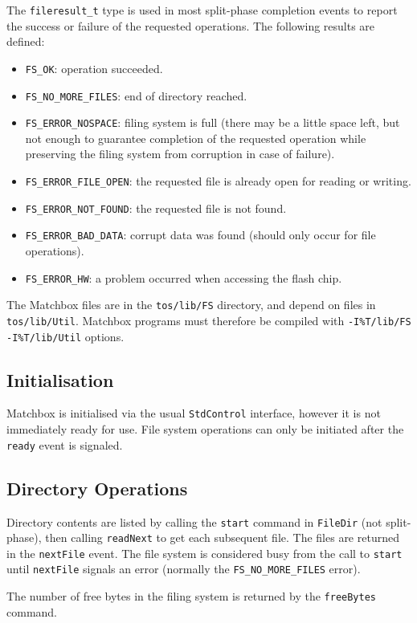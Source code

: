 \documentclass[10pt]{article}
\newcommand{\kw}[1]{\mbox{\tt #1}}
\newcommand{\file}[1]{\mbox{\tt #1}}
\begin{document}
The \kw{fileresult\_t} type is used in most split-phase completion events
to report the success or failure of the requested operations. The
following results are defined:
\begin{itemize}
\item \kw{FS\_OK}: operation succeeded.
\item \kw{FS\_NO\_MORE\_FILES}: end of directory reached.
\item \kw{FS\_ERROR\_NOSPACE}: filing system is full (there may be a
little space left, but not enough to guarantee completion of the requested
operation while preserving the filing system from corruption in case of
failure).
\item \kw{FS\_ERROR\_FILE\_OPEN}: the requested file is already open for
reading or writing.
\item \kw{FS\_ERROR\_NOT\_FOUND}: the requested file is not found.
\item \kw{FS\_ERROR\_BAD\_DATA}: corrupt data was found (should only occur
for file operations).
\item \kw{FS\_ERROR\_HW}: a problem occurred when accessing the flash chip.
\end{itemize}

The Matchbox files are in the \file{tos/lib/FS} directory, and depend
on files in \file{tos/lib/Util}. Matchbox programs must therefore be
compiled with \kw{-I\%T/lib/FS -I\%T/lib/Util} options.

\subsection{Initialisation}

Matchbox is initialised via the usual \kw{StdControl} interface, however it
is not immediately ready for use. File system operations can only be 
initiated after the \kw{ready} event is signaled.

\subsection{Directory Operations}

Directory contents are listed by calling the \kw{start} command in
\kw{FileDir} (not split-phase), then calling \kw{readNext} to get each
subsequent file. The files are returned in the \kw{nextFile} event. The
file system is considered busy from the call to \kw{start} until
\kw{nextFile} signals an error (normally the \kw{FS\_NO\_MORE\_FILES}
error).

The number of free bytes in the filing system is returned by the
\kw{freeBytes} command.
\end{document}
